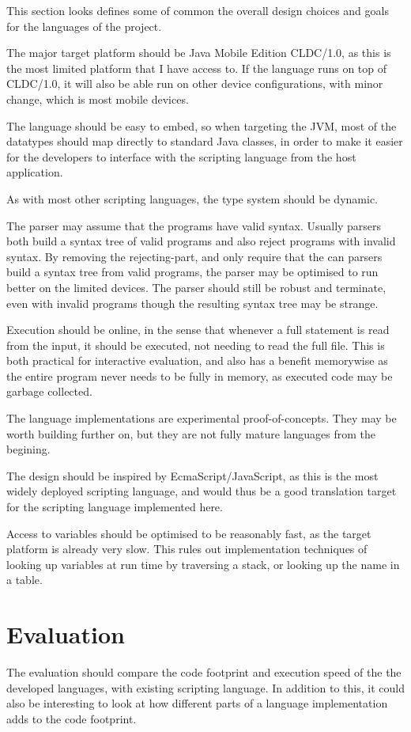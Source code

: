 \documentclass[11pt]{report}
\begin{document}
This section looks defines some of common the overall design choices and goals for the languages of the project.

The major target platform should be Java Mobile Edition CLDC/1.0, as this is the most limited platform that I have access to. 
If the language runs on top of CLDC/1.0, it will also be able run on other device configurations, with minor change, which is most mobile devices.

The language should be easy to embed, so when targeting the JVM, most of the datatypes should map directly to standard Java classes, in order to make it easier for the developers to interface with the scripting language from the host application.

As with most other scripting languages, the type system should be dynamic. 

The parser may assume that the programs have valid syntax. 
Usually parsers both build a syntax tree of valid programs and also reject programs with invalid syntax. 
By removing the rejecting-part, and only require that the can parsers build a syntax tree from valid programs, the parser may be optimised to run better on the limited devices.
The parser should still be robust and terminate, even with invalid programs though the resulting syntax tree may be strange.

Execution should be online, in the sense that whenever a full statement is read from the input, it should be executed, not needing to read the full file. This is both practical for interactive evaluation, and also has a benefit memorywise as the entire program never needs to be fully in memory, as executed code may be garbage collected.

The language implementations are experimental proof-of-concepts. They may be worth building further on, but they are not fully mature languages from the begining.

The design should be inspired by EcmaScript/JavaScript, as this is the most widely deployed scripting language, and would thus be a good translation target for the scripting language implemented here.

Access to variables should be optimised to be reasonably fast, as the target platform is already very slow. 
This rules out implementation techniques of looking up variables at run time by traversing a stack, or looking up the name in a table.

\section{Evaluation}
The evaluation should compare the code footprint and execution speed of the the developed languages, with existing scripting language.
In addition to this, it could also be interesting to look at how different parts of a language implementation adds to the code footprint.
\end{document}
